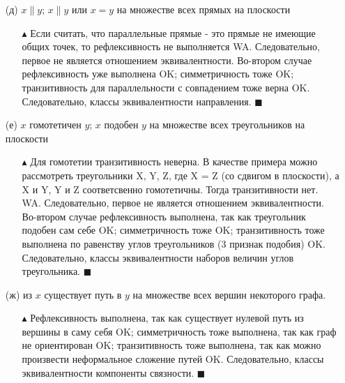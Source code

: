 \begin{enumerate}
    \item[(д)] $x\|y$; $x\|y$ или $x=y$ на множестве всех прямых на плоскости
    \begin{itemize}
        \item[$\blacktriangle$] Если считать, что параллельные прямые - это прямые не имеющие общих точек, то рефлексивность не выполняется {\color{Red}WA}. Следовательно, первое не является отношением эквивалентности.
        \newline Во-втором случае рефлексивность уже выполнена {\color{ForestGreen}OK}; симметричность тоже {\color{ForestGreen}OK}; транзитивность для параллельности с совпадением тоже верна {\color{ForestGreen}OK}. Следовательно, классы эквивалентности направления. $\blacksquare$
    \end{itemize}
    
    \item[(е)] $x$ гомотетичен $y$; $x$ подобен $y$ на множестве всех треугольников на плоскости
    \begin{itemize}
        \item[$\blacktriangle$] Для гомотетии транзитивность неверна. В качестве примера можно рассмотреть треугольники X, Y, Z, где X = Z (со сдвигом в плоскости), а X и Y, Y и Z соответсвенно гомотетичны. Тогда транзитивности нет. {\color{Red}WA}. Следовательно, первое не является отношением эквивалентности.
        \newline Во-втором случае рефлексивность выполнена, так как треугольник подобен сам себе {\color{ForestGreen}OK}; симметричность тоже {\color{ForestGreen}OK}; транзитивность тоже выполнена по равенству углов треугольников (3 признак подобия) {\color{ForestGreen}OK}. Следовательно, классы эквивалентности наборов величин углов треугольника. $\blacksquare$
    \end{itemize}
    
    \item[(ж)] из $x$ существует путь в $y$ на множестве всех вершин некоторого графа.
    \begin{itemize}
        \item[$\blacktriangle$] Рефлексивность выполнена, так как существует нулевой путь из вершины в саму себя {\color{ForestGreen}OK}; симметричность тоже выполнена, так как граф не ориентирован {\color{ForestGreen}OK}; транзитивность тоже выполнена, так как можно произвести неформальное сложение путей {\color{ForestGreen}OK}. Следовательно, классы эквивалентности компоненты связности. $\blacksquare$
    \end{itemize}
    

\end{enumerate}
